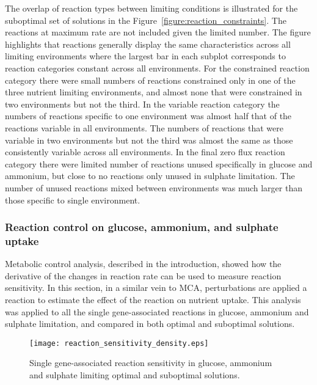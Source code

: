 The overlap of reaction types between limiting conditions is illustrated for the suboptimal set of solutions in the Figure~\vref{figure:reaction_constraints}. The reactions at maximum rate are not included given the limited number. The figure highlights that reactions generally display the same characteristics across all limiting environments where the largest bar in each subplot corresponds to reaction categories constant across all environments. For the constrained reaction category there were small numbers of reactions constrained only in one of the three nutrient limiting environments, and almost none that were constrained in two environments but not the third. In the variable reaction category the numbers of reactions specific to one environment was almost half that of the reactions variable in all environments. The numbers of reactions that were variable in two environments but not the third was almost the same as those consistently variable across all environments. In the final zero flux reaction category there were limited number of reactions unused specifically in glucose and ammonium, but close to no reactions only unused in sulphate limitation. The number of unused reactions mixed between environments was much larger than those specific to single environment.

\subsubsection{Reaction control on glucose, ammonium, and sulphate uptake}%

Metabolic control analysis, described in the introduction, showed how the derivative of the changes in reaction rate can be used to measure reaction sensitivity. In this section, in a similar vein to MCA, perturbations are applied a reaction to estimate the effect of the reaction on nutrient uptake. This analysis was applied to all the single gene-associated reactions in glucose, ammonium and sulphate limitation, and compared in both optimal and suboptimal solutions.

\begin{figure}%
  \centering
  \texttt{[image: reaction\_sensitivity\_density.eps]}
  \caption[Reaction sensitivity in glucose, ammonium and sulphate limitation]{Single gene-associated reaction sensitivity in glucose, ammonium and sulphate limiting optimal and suboptimal solutions. }
  \label{figure:sensitivity_density}
\end{figure}%


